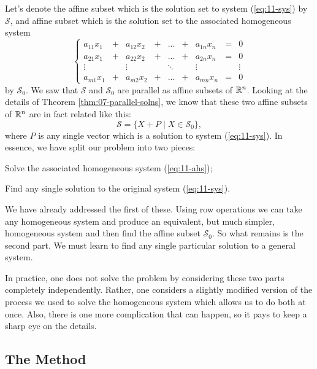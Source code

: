 \documentclass[elementsmain.tex]{subfiles}
\begin{document}
Let's denote the affine subset which is the solution set to system (\ref{eq:11-sys})  by $\mathcal{S}$, and affine subset which is the solution set to the associated homogeneous system
\begin{equation}\label{eq:11-ahs}
\left\{
\begin{array}{ccccccccc}
a_{11} x_1 & + & a_{12} x_2 & + & \dots & + & a_{1n} x_n & = & 0 \\
a_{21} x_1 & + & a_{22} x_2 & + & \dots & + & a_{2n} x_n & = & 0 \\
\vdots     &   & \vdots     &   & \ddots &  & \vdots     &  & \vdots \\ 
a_{m1} x_1 & + & a_{m2} x_2 & + & \dots & + & a_{mn} x_n & = & 0 
\end{array}\right.
\end{equation}
by  $\mathcal{S}_0$. We saw that $\mathcal{S}$ and $\mathcal{S}_0$ are parallel as affine subsets of $\mathbb{R}^n$. Looking at the details of Theorem \ref{thm:07-parallel-solns}, we know that these two affine subsets of $\mathbb{R}^n$ are in fact related like this:
\[
\mathcal{S} = \{ X + P \mid X \in \mathcal{S}_0 \},
\]
where $P$ is any single vector which is a solution to system (\ref{eq:11-sys}). 
In essence, we have split our problem into two pieces: 
\begin{compactenum}
\item Solve the associated homogeneous system (\ref{eq:11-ahs});
\item Find any single solution to the original system (\ref{eq:11-sys}).
\end{compactenum}

We have already addressed the first of these. Using row operations we can take any homogeneous system and produce an equivalent, but much simpler, homogeneous system and then find the affine subset $\mathcal{S}_0$. So what remains is the second part. We must learn to find any single particular solution to a general system.

In practice, one does not solve the problem by considering these two parts completely independently. Rather, one considers a slightly modified version of the process we used to solve the homogeneous system which allows us to do both at once.
Also, there is one more complication that can happen, so it pays to keep a sharp eye on the details.

\subsection*{The Method}
\end{document}
